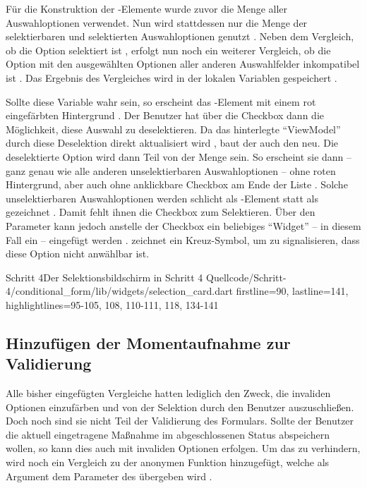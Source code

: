 Für die Konstruktion der -Elemente wurde zuvor die Menge aller Auswahloptionen verwendet.
Nun wird stattdessen nur die Menge der selektierbaren und selektierten Auswahloptionen genutzt .
Neben dem Vergleich,
ob die Option selektiert ist ,
erfolgt nun noch ein weiterer Vergleich,
ob die Option mit den ausgewählten Optionen aller anderen Auswahlfelder inkompatibel ist .
Das Ergebnis des Vergleiches wird in der lokalen Variablen  gespeichert .

Sollte diese Variable wahr sein,
so erscheint das -Element mit einem rot eingefärbten Hintergrund .
Der Benutzer hat über die Checkbox dann die Möglichkeit,
diese Auswahl zu deselektieren.
Da das hinterlegte \enquote{ViewModel} durch diese Deselektion direkt aktualisiert wird ,
baut der  auch den  neu.
Die deselektierte Option wird dann Teil von der Menge   sein.
So erscheint sie dann
-- ganz genau wie alle anderen unselektierbaren Auswahloptionen --
ohne roten Hintergrund, aber auch ohne anklickbare Checkbox am Ende der Liste .
Solche unselektierbaren Auswahloptionen werden schlicht als -Element statt als  gezeichnet .
Damit fehlt ihnen die Checkbox zum Selektieren.
Über den Parameter  kann jedoch anstelle der Checkbox ein beliebiges \enquote{Widget}
-- in diesem Fall ein  --
eingefügt werden .
 zeichnet ein Kreuz-Symbol,
um zu signalisieren,
dass diese Option nicht anwählbar ist. 

\begin{alexlisting}{Schritt 4}{Der Selektionsbildschirm in Schritt 4}
  {Quellcode/Schritt-4/conditional_form/lib/widgets/selection_card.dart}
  {firstline=90, lastline=141, highlightlines={95-105, 108, 110-111, 118, 134-141}}
  \label{lst:Schritt4selectedAndSelectableChoices}
\end{alexlisting} 

\clearpage
\subsection{Hinzufügen der Momentaufnahme zur Validierung}

Alle bisher eingefügten Vergleiche hatten lediglich den Zweck,
die invaliden Optionen einzufärben und von der Selektion durch den Benutzer auszuschließen.
Doch noch sind sie nicht Teil der Validierung des Formulars.
Sollte der Benutzer die aktuell eingetragene Maßnahme im abgeschlossenen Status abspeichern wollen,
so kann dies auch mit invaliden Optionen erfolgen.
Um das zu verhindern,
wird noch ein Vergleich zu der anonymen Funktion hinzugefügt,
welche als Argument dem Parameter  des  übergeben wird \Lst{\ref{lst:Schritt4validator}}.

